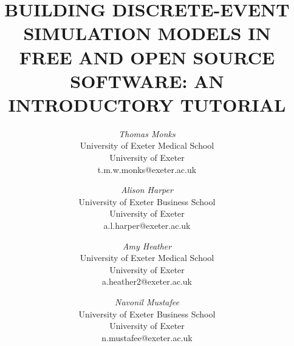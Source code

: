 \documentclass{swpaperproc}
\theoremstyle{sw}
\begin{document}


%
%

\title{BUILDING DISCRETE-EVENT SIMULATION MODELS IN FREE AND OPEN SOURCE SOFTWARE: AN INTRODUCTORY TUTORIAL}

\author{\textit{Thomas Monks}\\ [11pt]
University of Exeter Medical School\\
University of Exeter\\
t.m.w.monks@exeter.ac.uk\\
\and
\textit{Alison Harper}\\[11pt]
University of Exeter Business School\\
University of Exeter\\
a.l.harper@exeter.ac.uk\\
\and
\textit{Amy Heather}\\ [11pt]
University of Exeter Medical School\\
University of Exeter\\
a.heather2@exeter.ac.uk\\
\and
\textit{Navonil Mustafee}\\[11pt]
University of Exeter Business School\\
University of Exeter\\
n.mustafee@exeter.ac.uk\\
}

\maketitle
\end{document}
